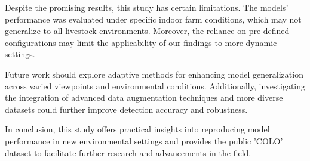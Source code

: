 Despite the promising results, this study has certain limitations. The models' performance was evaluated under specific indoor farm conditions, which may not generalize to all livestock environments. Moreover, the reliance on pre-defined configurations may limit the applicability of our findings to more dynamic settings.

Future work should explore adaptive methods for enhancing model generalization across varied viewpoints and environmental conditions. Additionally, investigating the integration of advanced data augmentation techniques and more diverse datasets could further improve detection accuracy and robustness.

In conclusion, this study offers practical insights into reproducing model performance in new environmental settings and provides the public 'COLO' dataset to facilitate further research and advancements in the field.